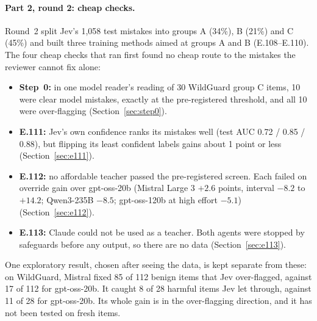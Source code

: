 \documentclass[11pt]{article}
\renewcommand{\_}{\origunderscore\allowbreak}
\begin{document}
\paragraph{Part 2, round 2: cheap checks.} Round~2 split Jev's 1,058 test mistakes into groups A (34\%), B (21\%) and C (45\%) and built three training methods aimed at groups A and B (E.108--E.110). The four cheap checks that ran first found no cheap route to the mistakes the reviewer cannot fix alone:
\begin{itemize}[leftmargin=*,itemsep=2pt]
  \item \textbf{Step~0:} in one model reader's reading of 30 WildGuard group C items, 10 were clear model mistakes, exactly at the pre-registered threshold, and all 10 were over-flagging (Section~\ref{sec:step0}).
  \item \textbf{E.111:} Jev's own confidence ranks its mistakes well (test AUC 0.72 / 0.85 / 0.88), but flipping its least confident labels gains about 1 point or less (Section~\ref{sec:e111}).
  \item \textbf{E.112:} no affordable teacher passed the pre-registered screen. Each failed on override gain over gpt-oss-20b (Mistral Large 3 $+2.6$ points, interval $-8.2$ to $+14.2$; Qwen3-235B $-8.5$; gpt-oss-120b at high effort $-5.1$) (Section~\ref{sec:e112}).
  \item \textbf{E.113:} Claude could not be used as a teacher. Both agents were stopped by safeguards before any output, so there are no data (Section~\ref{sec:e113}).
\end{itemize}
One exploratory result, chosen after seeing the data, is kept separate from these: on WildGuard, Mistral fixed 85 of 112 benign items that Jev over-flagged, against 17 of 112 for gpt-oss-20b. It caught 8 of 28 harmful items Jev let through, against 11 of 28 for gpt-oss-20b. Its whole gain is in the over-flagging direction, and it has not been tested on fresh items.
\end{document}
